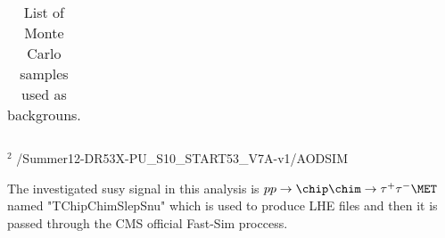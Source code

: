 \begin{table}[!ht]
\begin{center}
{\begin{tabular}{|l|l|c|}
\hline

\end{tabular}
}
\end{center}
$^{2}$ /Summer12-DR53X-PU\_S10\_START53\_V7A-v1/AODSIM\\

\caption{ 
  List of Monte Carlo samples used as backgrouns.
}
\label{Tab.MCSamples}

\end{table}

The investigated susy signal in this analysis is $pp \rightarrow \chip \chim \rightarrow \tau^+ \tau^- \MET$ named "TChipChimSlepSnu" which \PYTHIA is used to produce LHE files and then it is passed through the CMS official Fast-Sim proccess.
